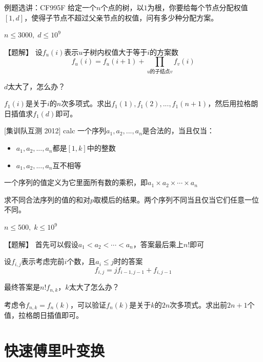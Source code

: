 \documentclass{beamer}
\begin{document}
\begin{frame}{例题选讲：CF995F}
    给定一个$n$个点的树，以$1$为根，你要给每个节点分配权值$[1,d]$，使得子节点不超过父亲节点的权值，问有多少种分配方案。

    $n\leq 3000,\; d\leq 10^{9}$

    \pause
    \vspace{1em}
    【题解】 设$f_{u}(i)$表示$u$子树内权值大于等于$i$的方案数
    \pause
    \begin{equation*}
        f_{u}(i)=f_{u}(i+1)+\prod_{u\text{的子结点}v} f_{v}(i)
    \end{equation*}

    $d$太大了，怎么办？

    \pause
    \vspace{1em}
    $f_1(i)$是关于$i$的$n$次多项式。求出$f_1(1),f_1(2),...,f_1(n+1)$，然后用拉格朗日插值求$f_1(d)$即可。
\end{frame}

\begin{frame}{[集训队互测 2012] calc}
    \small 
    一个序列$a_1,a_2,...,a_n$是合法的，当且仅当：
    \begin{itemize}
        \item $a_1,a_2,...,a_n$都是$[1,k]$中的整数
        \item $a_1,a_2,...,a_n$互不相等
    \end{itemize}

    一个序列的值定义为它里面所有数的乘积，即$a_1\times a_2\times \cdots \times a_n$

    求不同合法序列的值的和对$p$取模后的结果。两个序列不同当且仅当它们任意一位不同。

    $n\leq 500,\;k\leq 10^9$

    \pause
    \vspace{1em}
    【题解】 首先可以假设$a_1<a_2<\cdots < a_n$，答案最后乘上$n!$即可

    \pause
    设$f_{i,j}$表示考虑完前$i$个数，且$a_i\leq j$时的答案
    \pause
    \begin{equation*}
        f_{i,j}=jf_{i-1,j-1} + f_{i,j-1}
    \end{equation*}

    最终答案是$n!f_{n,k}$，$k$太大了怎么办？

    \pause
    考虑令$f_{n,k}=f_n(k)$，可以验证$f_n(k)$是关于$k$的$2n$次多项式。求出前$2n+1$个值，拉格朗日插值即可。
\end{frame}

\section{快速傅里叶变换}
\end{document}
